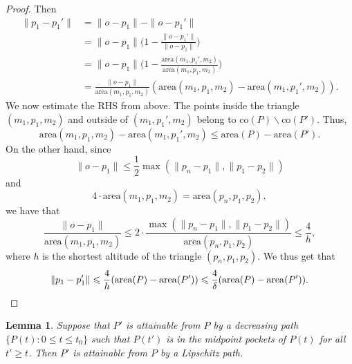 \documentclass[11pt]{amsart}
\newtheorem{lemma}[theorem]{Lemma}
\theoremstyle{remark}
\numberwithin{equation}{section}
\newcommand{\area}{\mathrm{area}}
\newcommand{\co}{\mathrm{co}}
\renewcommand{\leq}{\leqslant}
\renewcommand{\geq}{\geqslant}
\begin{document}
\begin{proof}
Then
\begin{align*}
\|p_1-p_1'\| &=\|o-p_1\| - \|o-p_1'\|\\
& = \|o-p_1\|\Big(1-\frac{\|o-p_1'\|}{\|o-p_1\|}\Big)\\
& = \|o-p_1\|\Big(1-\frac{\area(m_1,p_1',m_2)}{\area(m_1,p_1,m_2)}\Big) \\
& = \frac{\|o-p_1\|}{\area(m_1,p_1,m_2)} (\area(m_1,p_1,m_2)- \area(m_1,p_1',m_2)).
\end{align*}
We now estimate the RHS from above.
The points inside the triangle $(m_1,p_1,m_2)$ and outside of $(m_1,p_1',m_2)$ belong to $\co(P)\backslash \co(P')$. Thus,
\[
\area(m_1,p_1,m_2)- \area(m_1,p_1',m_2)\leq \area(P)-\area(P').
\]
On the other hand, since 
\[
\|o-p_1\| \leq \frac12\max(\|p_n-p_1\|,\|p_1-p_2\|)
\]
and 
\[
4\cdot \area(m_1,p_1,m_2) =\area(p_n,p_1,p_2),
\]
we have that
\[
\frac{\|o-p_1\|}{\area(m_1,p_1,m_2)} \leq 2\cdot \frac{\max(\|p_n-p_1\|,\|p_1-p_2\|)}{\area(p_n,p_1,p_2)}\leq  \frac4h,
\]
where $h$ is the shortest  altitude of the triangle $(p_n,p_1,p_2)$. We thus get that
\[
\|p_1-p_1'\| \leq \frac{4}{h}(\area(P)-\area(P'))\leq \frac{4}{\delta}(\area(P)-\area(P')).\qedhere
\]
\end{proof}




\begin{lemma}\label{reparametrize} 
Suppose that $P'$ is attainable from $P$ by a decreasing path $\{P(t):0\leq t \leq t_0\}$ such that  $P(t')$ is in the midpoint pockets of $P(t)$ for all $t'\geq t$. Then $P'$ is attainable from $P$ by a Lipschitz path.
\end{lemma}
\end{document}
